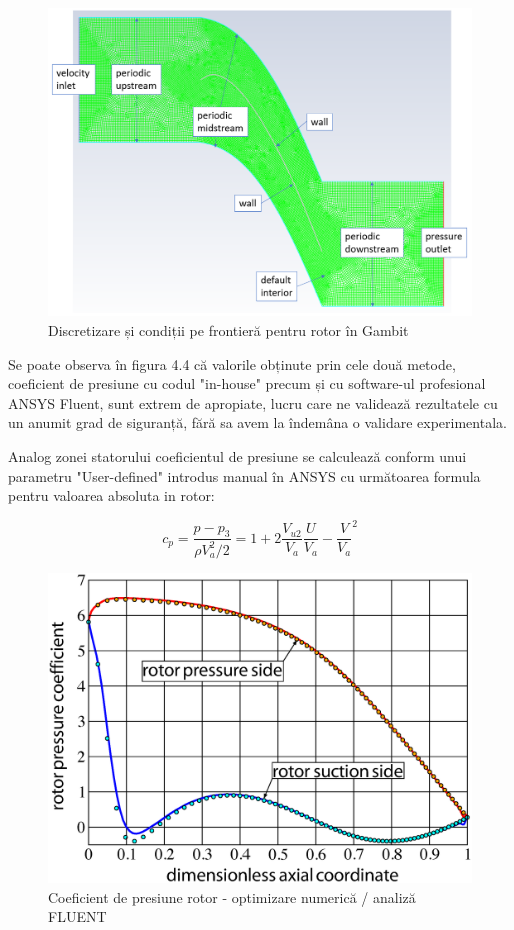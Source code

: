\begin{figure}[h]
	\centering
	\includegraphics[scale=0.5]{figures/mesh-rotor-boundary.PNG}
	\caption{Discretizare și condiții pe frontieră pentru rotor în Gambit}
	\label{Discretizare și condiții pe frontieră pentru rotor în Gambit}
\end{figure}

Se poate observa în figura 4.4 că valorile obținute prin cele două metode, coeficient de presiune cu codul "in-house" precum și cu software-ul profesional ANSYS Fluent, sunt extrem de apropiate, lucru care ne validează rezultatele cu un anumit grad de siguranță, fără sa avem la îndemâna o validare experimentala.

Analog zonei statorului coeficientul de presiune se calculează conform unui parametru "User-defined" introdus manual în ANSYS cu următoarea formula pentru valoarea absoluta in rotor:

\begin{equation}
c_p = \frac{p-p_3}{\rho V_a^2 / 2} = 1 + 2 \frac{V_{u2}}{V_a} \frac{U}{V_a} - {\frac{V}{V_a}}^2
\end{equation}


\begin{figure}[t!]
	\centering
	\includegraphics[scale=0.4]{figures/cp-rotor-ezdraw.eps}
	\caption{Coeficient de presiune rotor - optimizare numerică / analiză FLUENT}
	\label{Coeficient de presiune rotor - optimizare numerică / analiză FLUENT}
\end{figure}

